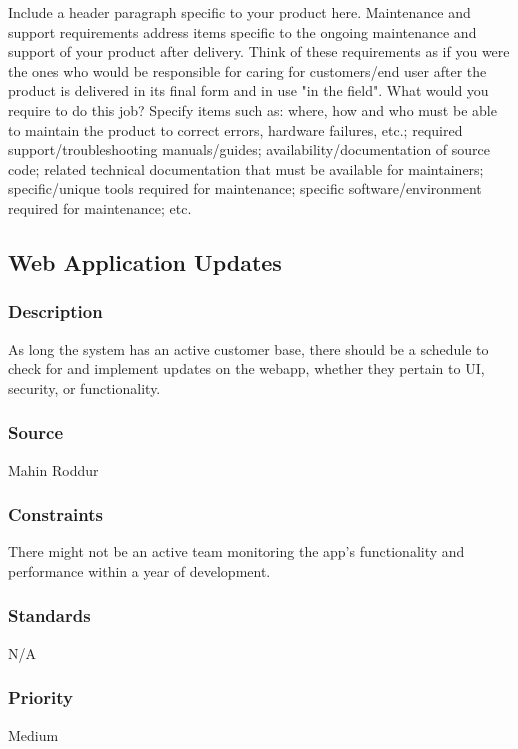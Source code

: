 Include a header paragraph specific to your product here. Maintenance and support requirements address items specific to the ongoing maintenance and support of your product after delivery. Think of these requirements as if you were the ones who would be responsible for caring for customers/end user after the product is delivered in its final form and in use "in the field". What would you require to do this job? Specify items such as: where, how and who must be able to maintain the product to correct errors, hardware failures, etc.; required support/troubleshooting manuals/guides; availability/documentation of source code; related technical documentation that must be available for maintainers; specific/unique tools required for maintenance; specific software/environment required for maintenance; etc.

\subsection{Web Application Updates}
\subsubsection{Description}
As long the system has an active customer base, there should be a schedule to check for and implement updates on the webapp, whether they pertain to UI, security, or functionality.
\subsubsection{Source}
Mahin Roddur
\subsubsection{Constraints}
There might not be an active team monitoring the app's functionality and performance within a year of development.
\subsubsection{Standards}
N/A
\subsubsection{Priority}
Medium
